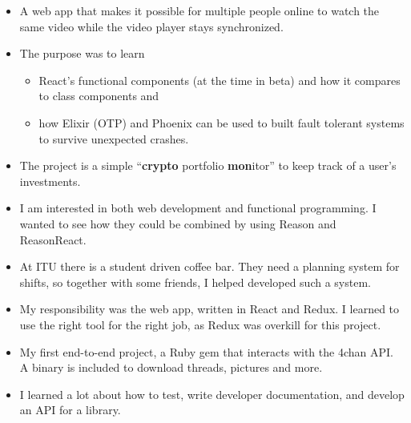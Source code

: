 \begin{itemize}
  \item A web app that makes it possible for multiple people online to watch the
  same video while the video player stays synchronized.
  \item The purpose was to learn
  \begin{itemize}
    \item React's functional components (at the time in beta) and how
    it compares to class components and
    \item how Elixir (OTP) and Phoenix can be used to built fault tolerant
    systems to survive unexpected crashes.
  \end{itemize}
\end{itemize}
\begin{itemize}
  \item The project is a simple ``\textbf{crypto} portfolio \textbf{mon}itor''
  to keep track of a user's investments.
  \item I am interested in both web development and functional programming. I
  wanted to see how they could be combined by using Reason and ReasonReact.
\end{itemize}
\smallskip
\smallskip
{}
\begin{itemize}
  \item At ITU there is a student driven coffee bar. They need a planning system
  for shifts, so together with some friends, I helped developed such a system.
  \item My responsibility was the web app, written in React and Redux. I learned
  to use the right tool for the right job, as Redux was overkill for this
  project.
\end{itemize}
\smallskip
\smallskip
{}
\begin{itemize}
  \item My first end-to-end project, a Ruby gem that interacts with the 4chan
  API. A binary is included to download threads, pictures and more.
  \item I learned a lot about how to test, write developer documentation, and
  develop an API for a library.
\end{itemize}
